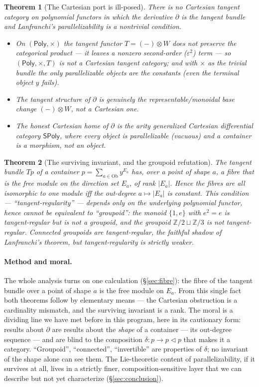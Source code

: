 \documentclass[11pt]{article}
\newtheorem{theorem}{Theorem}
\theoremstyle{definition}
\newcommand{\Poly}{\mathsf{Poly}}
\newcommand{\SPoly}{\mathsf{SPoly}}
\newcommand{\Ob}{\mathrm{Ob}}
\newcommand{\Z}{\mathbb{Z}}
\begin{document}
\begin{theorem}[The Cartesian port is ill-posed]\label{thm:I-intro}
There is no Cartesian tangent category on polynomial functors in which the derivative $\partial$
is the tangent bundle and Lanfranchi's parallelizability is a nontrivial condition.
\begin{itemize}
\item On $(\Poly,\times)$ the tangent functor $T=(-)\otimes W$ does not preserve the categorical
product --- it leaves a nonzero second-order ($\varepsilon^2$) term --- so $(\Poly,\times,T)$ is
not a Cartesian tangent category; and with $\times$ as the trivial bundle the \emph{only}
parallelizable objects are the constants (even the terminal object $y$ fails).
\item The tangent structure of $\partial$ is genuinely the \emph{representable/monoidal} base
change $(-)\otimes W$, not a Cartesian one.
\item The honest Cartesian home of $\partial$ is the arity generalized Cartesian differential
category $\SPoly$, where every object is parallelizable (vacuous) and a container is a
\emph{morphism}, not an object.
\end{itemize}
\end{theorem}

\begin{theorem}[The surviving invariant, and the groupoid refutation]\label{thm:II-intro}
The tangent bundle $Tp$ of a container $p=\sum_{a\in\Ob}y^{E_a}$ has, over a point of shape $a$,
a fibre that is the free module on the direction set $E_a$, of rank $|E_a|$. Hence the fibres are
all isomorphic to one module iff the out-degree $a\mapsto|E_a|$ is constant. This condition ---
``tangent-regularity'' --- depends only on the underlying polynomial functor, hence cannot be
equivalent to ``groupoid'': the monoid $\{1,e\}$ with $e^2=e$ is tangent-regular but is not a
groupoid, and the groupoid $\Z/2\sqcup\Z/3$ is not tangent-regular. Connected groupoids are
tangent-regular, the faithful shadow of Lanfranchi's theorem, but tangent-regularity is strictly
weaker.
\end{theorem}

\paragraph{Method and moral.}
The whole analysis turns on one calculation (\S\ref{sec:fibre}): the fibre of the tangent bundle
over a point of shape $a$ is the free module on $E_a$. From this single fact both theorems follow
by elementary means --- the Cartesian obstruction is a cardinality mismatch, and the surviving
invariant is a rank. The moral is a dividing line we have met before in this program, here in its
cautionary form: results about $\partial$ are results about the \emph{shape} of a container --- its
out-degree sequence --- and are blind to the composition $\delta\colon p\to p\lhd p$ that makes it
a category. ``Groupoid'', ``connected'', ``invertible'' are properties of $\delta$; no invariant
of the shape alone can see them. The Lie-theoretic content of parallelizability, if it survives at
all, lives in a strictly finer, composition-sensitive layer that we can describe but not yet
characterize (\S\ref{sec:conclusion}).
\end{document}
